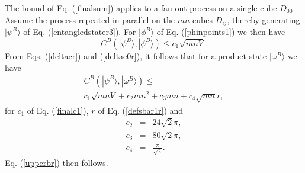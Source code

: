 \documentclass[12pt,amsmath,amssymb,onecolumn]{revtex4-2}
\begin{document}
The bound of Eq. (\ref{finalsum}) applies to a fan-out process on a 
single cube $D_{00}$. Assume the process repeated in parallel on the
$mn$ cubes $D_{ij}$, thereby generating $|\psi^B \rangle $ of Eq. (\ref{entangledstater3}).
For $|\phi^B \rangle $ of Eq. (\ref{phinpoints1}) we then have
\begin{equation}
\label{psiphir}
C^B( |\psi^B \rangle , |\phi^B \rangle ) \le  c_1 \sqrt{mnV}.
\end{equation}
From Eqs. (\ref{deltacr}) and (\ref{deltac0r}), it follows that for a product state
$|\omega^B \rangle $ we have
\begin{multline}
\label{psiomegar}
C^B(|\psi^B \rangle ,|\omega^B \rangle ) \le \\ c_1 \sqrt{ mnV} + c_2 m n^2 + c_3 mn + c_4\sqrt{mn} r, 
\end{multline}
for $c_1$ of Eq. (\ref{finalc1}), $r$ of  Eq. (\ref{defsbar1r}) and 
\begin{subequations}
\begin{eqnarray}
\label{defc2r}
c_2 & = & 24 \sqrt{2} \pi, \\
\label{defc21r}
c_3 & = & 80 \sqrt{2} \pi, \\
\label{defc32r}
c_4 & = & \frac{\pi}{\sqrt{2}}.
\end{eqnarray}
\end{subequations}
Eq. (\ref{upperbr}) then follows.
\end{document}
